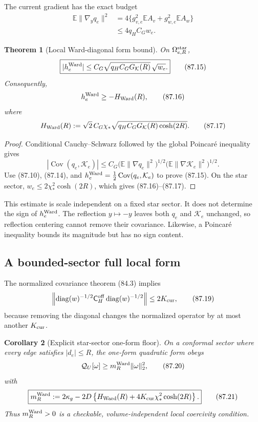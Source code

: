 \documentclass[11pt]{article}
\newtheorem{theorem}{Theorem}[section]
\newtheorem{corollary}[theorem]{Corollary}
\theoremstyle{remark}
\begin{document}
The current gradient has the exact budget
\[
\begin{aligned}
 \mathbb E\|\nabla_yq_e\|^2
 &=4\{g_{v,e}^2\mathbb EA_v+g_{w,e}^2\mathbb EA_w\}\\
 &\leq4q_HC_Gw_e.                                 \tag{87.14}
\end{aligned}
\]

\begin{theorem}[Local Ward-diagonal form bound]
\label{thm:v17v87-ward-bound}
On \(\Omega_{e,R}^{\rm star}\),
\[
\boxed{
 |h_e^{\rm Ward}|
 \leq C_G\sqrt{q_HC_GG_{\mathcal K}(R)}\,\sqrt{w_e}.}            \tag{87.15}
\]
Consequently,
\[
 h_e^{\rm Ward}\geq-H_{\rm Ward}(R),             \tag{87.16}
\]
where
\[
 H_{\rm Ward}(R)
 :=\sqrt2\,C_G\chi_*\sqrt{q_HC_GG_{\mathcal K}(R)
                         \cosh(2R)}.              \tag{87.17}
\]
\end{theorem}

\begin{proof}
Conditional Cauchy--Schwarz followed by the global Poincar\'e
inequality gives
\[
 |\operatorname{Cov}(q_e,\mathcal K_e)|
 \leq C_G
 \bigl(\mathbb E\|\nabla q_e\|^2\bigr)^{1/2}
 \bigl(\mathbb E\|\nabla\mathcal K_e\|^2\bigr)^{1/2}.    \tag{87.18}
\]
Use (87.10), (87.14), and
\(h_e^{\rm Ward}=\frac12\operatorname{Cov}(q_e,\mathcal K_e)\)
to prove (87.15).  On the star sector,
\(w_e\leq2\chi_*^2\cosh(2R)\), which gives
(87.16)--(87.17).
\end{proof}

This estimate is scale independent on a fixed star sector.  It does
not determine the sign of \(h_e^{\rm Ward}\).  The reflection
\(y\mapsto-y\) leaves both \(q_e\) and \(\mathcal K_e\) unchanged, so
reflection centering cannot remove their covariance.  Likewise, a
Poincar\'e inequality bounds its magnitude but has no sign content.

\subsection{A bounded-sector full local form}

The normalized covariance theorem (84.3) implies
\[
 \left\|
 \operatorname{diag}(w)^{-1/2}\mathsf C_H^{\rm off}
 \operatorname{diag}(w)^{-1/2}
 \right\|
 \leq2K_{\rm cur},                                \tag{87.19}
\]
because removing the diagonal changes the normalized operator by at
most another \(K_{\rm cur}\).

\begin{corollary}[Explicit star-sector one-form floor]
\label{cor:v17v87-floor}
On a conformal sector where every edge satisfies \(|d_e|\leq R\),
the one-form quadratic form obeys
\[
 \mathcal Q_U[\omega]
 \geq m_R^{\rm Ward}\|\omega\|_2^2,              \tag{87.20}
\]
with
\[
\boxed{
 m_R^{\rm Ward}
 :=2\kappa_g-2D\left\{
 H_{\rm Ward}(R)+4K_{\rm cur}\chi_*^2\cosh(2R)
 \right\}.}                                      \tag{87.21}
\]
Thus \(m_R^{\rm Ward}>0\) is a checkable, volume-independent local
coercivity condition.
\end{corollary}
\end{document}
